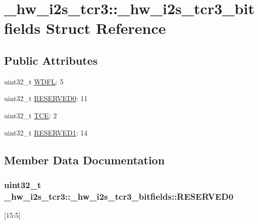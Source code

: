 \hypertarget{struct__hw__i2s__tcr3_1_1__hw__i2s__tcr3__bitfields}{}\section{\+\_\+hw\+\_\+i2s\+\_\+tcr3\+:\+:\+\_\+hw\+\_\+i2s\+\_\+tcr3\+\_\+bitfields Struct Reference}
\label{struct__hw__i2s__tcr3_1_1__hw__i2s__tcr3__bitfields}
\subsection*{Public Attributes}
\begin{DoxyCompactItemize}
\item 
uint32\+\_\+t \hyperlink{struct__hw__i2s__tcr3_1_1__hw__i2s__tcr3__bitfields_ae5cf2f5d872f1eacd020e1d1bef67497}{W\+D\+FL}\+: 5
\item 
uint32\+\_\+t \hyperlink{struct__hw__i2s__tcr3_1_1__hw__i2s__tcr3__bitfields_a5c63d75cc82e50e64d600f4d800f3964}{R\+E\+S\+E\+R\+V\+E\+D0}\+: 11
\item 
uint32\+\_\+t \hyperlink{struct__hw__i2s__tcr3_1_1__hw__i2s__tcr3__bitfields_afd4f58c6c4dd22d66f9bfd40510adb8f}{T\+CE}\+: 2
\item 
uint32\+\_\+t \hyperlink{struct__hw__i2s__tcr3_1_1__hw__i2s__tcr3__bitfields_a788b6d3ff169d27af08570e702c324e7}{R\+E\+S\+E\+R\+V\+E\+D1}\+: 14
\end{DoxyCompactItemize}


\subsection{Member Data Documentation}
\subsubsection[{\texorpdfstring{R\+E\+S\+E\+R\+V\+E\+D0}{RESERVED0}}]{\setlength{\rightskip}{0pt plus 5cm}uint32\+\_\+t \+\_\+hw\+\_\+i2s\+\_\+tcr3\+::\+\_\+hw\+\_\+i2s\+\_\+tcr3\+\_\+bitfields\+::\+R\+E\+S\+E\+R\+V\+E\+D0}\hypertarget{struct__hw__i2s__tcr3_1_1__hw__i2s__tcr3__bitfields_a5c63d75cc82e50e64d600f4d800f3964}{}\label{struct__hw__i2s__tcr3_1_1__hw__i2s__tcr3__bitfields_a5c63d75cc82e50e64d600f4d800f3964}
\mbox{[}15\+:5\mbox{]} 
